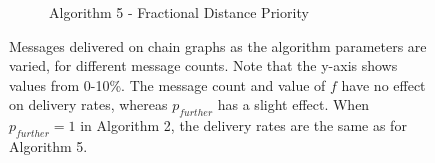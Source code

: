 \documentclass[bsc,frontabs,twoside,singlespacing,parskip,deptreport]{infthesis}     %
\begin{document}
\begin{figure}[]
\begin{subfigure}[]{0.40\textwidth}
\caption{Algorithm 5 - Fractional Distance Priority}
\end{subfigure}
\caption{Messages delivered on chain graphs as the algorithm parameters are varied, for different message counts. Note that the y-axis shows values from 0-10\%. The message count and value of $f$ have no effect on delivery rates, whereas $p_{further}$ has a slight effect. When $p_{further}=1$ in Algorithm 2, the delivery rates are the same as for Algorithm 5.}
\label{fig:chain_params}
\end{figure}
\end{document}
